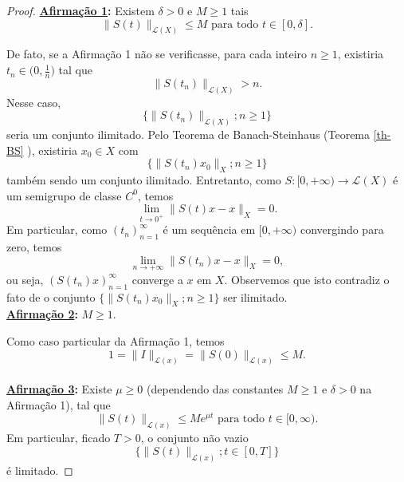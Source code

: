 \begin{proof} \textbf{\underline{Afirmação 1}:} Existem $\delta >0$ e $M\geq 1$ tais 
\begin{equation*}
\|S(t) \|_{\mathcal L (X)} \leq M \text{ para todo } t\in [0,\delta].
\end{equation*}

De fato, se a Afirmação 1 não se verificasse, para cada inteiro $n\geq 1$, existiria $t_n \in \bigg( 0,\frac{1}{n} \bigg)$ tal que
\[
\displaystyle \| S(t_n )\|_{\mathcal L (X)} >n.
\]
Nesse caso, 
\[
\displaystyle \{ \|S(t_n )\|_{\mathcal L (X)}; n\geq 1\}
\]
seria um conjunto ilimitado. Pelo Teorema de Banach-Steinhaus (Teorema \ref{th-BS} ), existiria $x_0 \in X$ com
\[
\displaystyle \{\|S(t_n) x_0 \|_{X}; n\geq 1 \}
\]
também sendo um conjunto ilimitado. Entretanto, como $S:[0,+\infty) \longrightarrow \mathcal L(X)$ é um semigrupo de classe $C^0$, temos
\[
\displaystyle\lim_{t\to 0^+} \|S(t)x - x\|_X =0.
\]
Em particular, como $(t_n)_{n=1}^{\infty}$ é um sequência em $[0,+\infty )$ convergindo para zero, temos
\[
\displaystyle\lim_{n\to +\infty} \|S(t_n)x - x\|_X =0,
\]
ou seja, $(S(t_n)x)_{n=1}^{\infty}$ converge a $x$ em $X$. Observemos que isto contradiz o fato de 
o conjunto $\{\|S(t_n) x_0 \|_{X}; n\geq 1 \}$ ser ilimitado. \\

\noindent\textbf{\underline{Afirmação 2}:} $M\geq 1$.

Como caso particular da Afirmação 1, temos
\[
\displaystyle 1=\|I\|_{\mathcal L (x)} = \| S(0)\|_{\mathcal L (x)} \leq M.
\]
\\

\noindent\textbf{\underline{Afirmação 3}:} Existe $\mu \geq 0$ (dependendo das constantes $M\geq 1$ e $\delta >0$ na Afirmação 1), tal que 
\[
\displaystyle \| S(t)\|_{\mathcal L (x)} \leq Me^{\mu t} \text{ para todo } t\in [0,\infty). 
\]
Em particular, ficado $T>0$, o conjunto não vazio 
\[
\displaystyle \{ \| S(t)\|_{\mathcal L (x)}; t\in [0,T]\}
\]
é limitado.


\end{proof}

